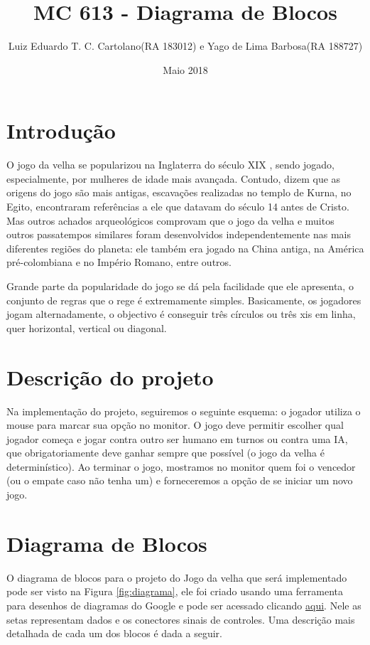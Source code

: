 \documentclass{article}
\begin{document}
\title{MC 613 - Diagrama de Blocos}
\author{Luiz Eduardo T. C. Cartolano(RA 183012)
        e Yago de Lima Barbosa(RA 188727) }
\date{Maio 2018}

\maketitle

\section{Introdução}
O jogo da velha se popularizou na Inglaterra do século XIX \cite{ref:velha-hist}, sendo jogado, especialmente, por mulheres de idade mais avançada. Contudo, dizem que as origens do jogo são mais antigas, escavações realizadas no templo de Kurna, no Egito, encontraram referências a ele que datavam do século 14 antes de Cristo. Mas outros achados arqueológicos comprovam que o jogo da velha e muitos outros passatempos similares foram desenvolvidos independentemente nas mais diferentes regiões do planeta: ele também era jogado na China antiga, na América pré-colombiana e no Império Romano, entre outros.

Grande parte da popularidade do jogo se dá pela facilidade que ele apresenta, o conjunto de regras\cite{ref:velha-regras} que o rege é extremamente simples. Basicamente, os jogadores jogam alternadamente, o objectivo é conseguir três círculos ou três xis em linha, quer horizontal, vertical ou diagonal.

\section{Descrição do projeto}
Na implementação do projeto, seguiremos o seguinte esquema: o jogador utiliza o mouse para marcar sua opção no monitor. O jogo deve permitir escolher qual jogador começa e jogar contra outro ser humano em turnos ou contra uma IA, que obrigatoriamente deve ganhar sempre que possível (o jogo da velha é determinístico). Ao terminar o jogo, mostramos no monitor quem foi o vencedor (ou o empate caso não tenha um) e forneceremos a opção de se iniciar um novo jogo.


\section{Diagrama de Blocos}
O diagrama de blocos para o projeto do Jogo da velha que será implementado pode ser visto na Figura \ref{fig:diagrama}, ele foi criado usando uma ferramenta para desenhos de diagramas do Google e pode ser acessado clicando \href{https://drive.google.com/file/d/1U_X492n2xRLVOVa0kffrWD5SYa2kWRCx/view?usp=sharing}{aqui}. Nele as setas representam dados e os conectores sinais de controles. Uma descrição mais detalhada de cada um dos blocos é dada a seguir.
\end{document}
